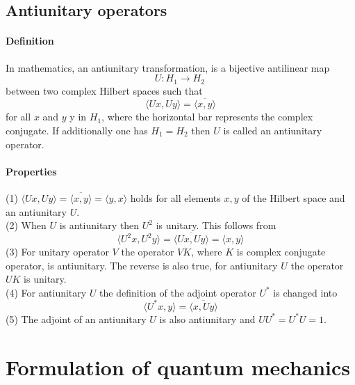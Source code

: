 \documentclass{article}
\begin{document}
\subsection{Antiunitary operators}
\paragraph{Definition} In mathematics, an antiunitary transformation, is a bijective antilinear map
\[U:H_{1}\to H_{2}\,\]
between two complex Hilbert spaces such that
\[\langle Ux,Uy\rangle ={\overline {\langle x,y\rangle }}\]
for all $x$ and $y$ y in $H_{1}$, where the horizontal bar represents the complex conjugate. If additionally one has $H_{1}=H_{2}$ then $U$ is called an antiunitary operator.

\paragraph{Properties}
(1) $\langle Ux,Uy\rangle =\overline {\langle x,y\rangle }=\langle y,x\rangle$ holds for all elements $x, y$ of the Hilbert space and an antiunitary $U$.\\
(2) When $U$ is antiunitary then $U^{2}$ is unitary. This follows from
\[ \langle U^{2}x,U^{2}y\rangle =\overline {\langle Ux,Uy\rangle }=\langle x,y\rangle\]
(3) For unitary operator $V$ the operator $VK$, where $K$ is complex conjugate operator, is antiunitary. The reverse is also true, for antiunitary $U$ the operator $UK$ is unitary.\\
(4) For antiunitary $U$ the definition of the adjoint operator $U^{*}$ is changed into
\[\langle U^{*}x,y\rangle =\overline {\langle x,Uy\rangle }\]
(5) The adjoint of an antiunitary $U$ is also antiunitary and $UU^{*}=U^{*}U=1$.

\section{Formulation of quantum mechanics}
\end{document}
